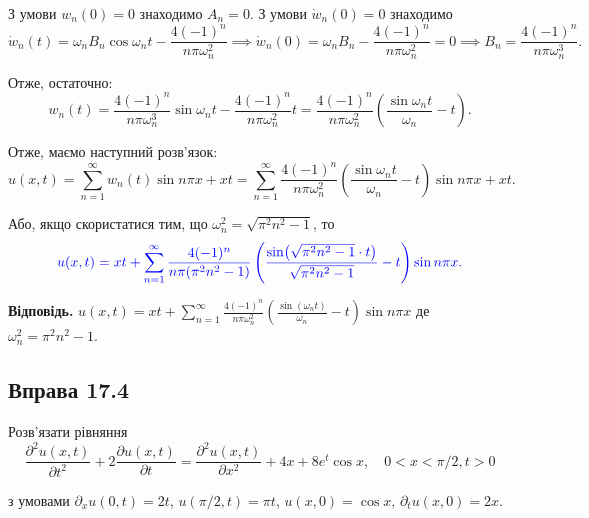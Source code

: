 \documentclass{hw_template}
\begin{document}
З умови $w_n(0)=0$ знаходимо $A_n=0$. З умови $\dot{w}_n(0)=0$ знаходимо
\begin{equation*}
    \dot{w}_n(t) = \omega_n B_n \cos \omega_n t - \frac{4(-1)^n}{n\pi\omega_n^2} \implies \dot{w}_n(0) = \omega_n B_n - \frac{4(-1)^n}{n\pi\omega_n^2} = 0 \implies B_n = \frac{4(-1)^n}{n\pi\omega_n^3}.
\end{equation*}

Отже, остаточно:
\begin{equation*}
    w_n(t) = \frac{4(-1)^n}{n\pi\omega_n^3}\sin \omega_n t - \frac{4(-1)^n}{n\pi\omega_n^2}t = \frac{4(-1)^n}{n\pi\omega_n^2}\left(\frac{\sin \omega_n t}{\omega_n} - t\right).
\end{equation*}

Отже, маємо наступний розв'язок:
\begin{equation*}
    u(x,t) = \sum_{n=1}^{\infty} w_n(t)\sin n\pi x + xt = \sum_{n=1}^{\infty} \frac{4(-1)^n}{n\pi\omega_n^2}\left(\frac{\sin \omega_n t}{\omega_n} - t\right)\sin n\pi x + xt.
\end{equation*}

Або, якщо скористатися тим, що $\omega_n^2 = \sqrt{\pi^2n^2-1}$, то
\begin{equation*}
    \textcolor{blue}{u(x,t) = xt + \sum_{n=1}^{\infty} \frac{4(-1)^n}{n\pi(\pi^2n^2-1)}\left(\frac{\sin(\sqrt{\pi^2n^2-1}\cdot t)}{\sqrt{\pi^2n^2-1}} - t\right)\sin n\pi x.}
\end{equation*}

\textbf{Відповідь.} $u(x,t) = xt + \sum_{n=1}^{\infty} \frac{4(-1)^n}{n\pi\omega_n^2}\left(\frac{\sin(\omega_n t)}{\omega_n} - t\right)\sin n\pi x$ де $\omega_n^2 = \pi^2n^2-1$.

\newpage

\subsection{Вправа 17.4}

\begin{problem}
    Розв'язати рівняння
    \begin{equation*}
        \frac{\partial^2 u(x,t)}{\partial t^2} + 2\frac{\partial u(x,t)}{\partial t} = \frac{\partial^2 u(x,t)}{\partial x^2} + 4x + 8e^t\cos x, \quad 0 < x < \pi/2, t>0
    \end{equation*}

    з умовами $\partial_xu(0,t)=2t$, $u(\pi/2,t)=\pi t$, $u(x,0)=\cos x$, $\partial_t u(x,0)=2x$.
\end{problem}
\end{document}
